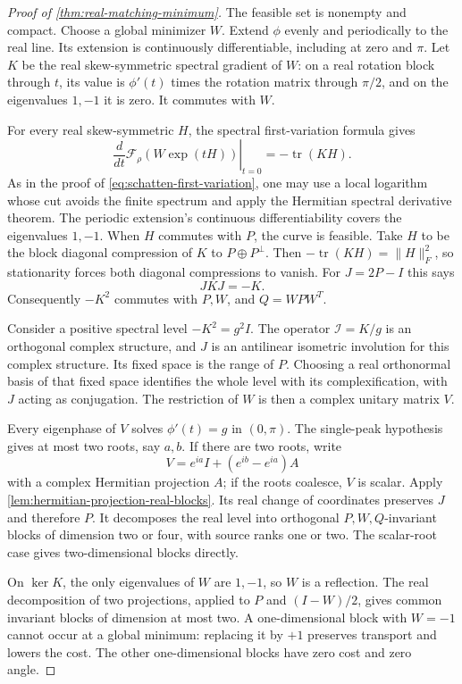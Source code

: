 \begin{proof}[Proof of \cref{thm:real-matching-minimum}]
The feasible set is nonempty and compact. Choose a global minimizer $W$.
Extend $\phi$ evenly and periodically to the real line. Its extension is
continuously differentiable, including at zero and $\pi$.
Let $K$ be the real skew-symmetric spectral gradient of $W$: on a real
rotation block through $t$, its value is $\phi'(t)$ times the rotation matrix through $\pi/2$, and on the eigenvalues $1,-1$ it is zero.
It commutes with $W$.

For every real skew-symmetric $H$, the spectral first-variation formula
\citep{lewis1996derivatives} gives
\[
 \left.\frac{d}{dt}\mathcal F_\rho(W\exp(tH))\right|_{t=0}
       =-\operatorname{tr}(KH).
\]
As in the proof of \cref{eq:schatten-first-variation}, one may use a local
logarithm whose cut avoids the finite spectrum and apply the Hermitian
spectral derivative theorem. The periodic extension's continuous
differentiability covers the eigenvalues $1,-1$.
When $H$ commutes with $P$, the curve is feasible. Take $H$ to be the
block diagonal compression of $K$ to $P\oplus P^\perp$.
Then $-\operatorname{tr}(KH)=\|H\|_F^2$, so stationarity forces
both diagonal compressions to vanish. For $J=2P-I$ this says
\[
 JKJ=-K.
\]
Consequently $-K^2$ commutes with $P,W$, and $Q=WPW^T$.

Consider a positive spectral level $-K^2=g^2I$. The operator
$\mathcal I=K/g$ is an orthogonal complex structure, and $J$ is an
antilinear isometric involution for this complex structure. Its fixed
space is the range of $P$. Choosing a real orthonormal basis of that
fixed space identifies the whole level with its complexification,
with $J$ acting as conjugation. The restriction of $W$ is then a
complex unitary matrix $V$.

Every eigenphase of $V$ solves $\phi'(t)=g$ in $(0,\pi)$.
The single-peak hypothesis gives at most two roots, say $a,b$.
If there are two roots, write
\[
 V=e^{ia}I+(e^{ib}-e^{ia})A
\]
with a complex Hermitian projection $A$; if the roots coalesce,
$V$ is scalar. Apply \cref{lem:hermitian-projection-real-blocks}.
Its real change of coordinates preserves $J$ and therefore $P$.
It decomposes the real level into orthogonal $P,W,Q$-invariant
blocks of dimension two or four, with source ranks one or two.
The scalar-root case gives two-dimensional blocks directly.

On $\ker K$, the only eigenvalues of $W$ are $1,-1$, so $W$ is a
reflection. The real decomposition of two projections, applied to
$P$ and $(I-W)/2$, gives common invariant blocks of dimension at most
two. A one-dimensional block with $W=-1$ cannot occur at a global
minimum: replacing it by $+1$ preserves transport and lowers the cost.
The other one-dimensional blocks have zero cost and zero angle.


\end{proof}
